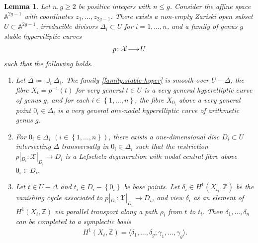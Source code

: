 \documentclass[a4paper,11pt,reqno]{amsart}
\makeatletter
\numberwithin{equation}{section}
\theoremstyle{plain}
\newtheorem{lemma}[theorem]{Lemma}
\theoremstyle{definition}
\newcommand{\Z}{\mathbb Z}
\newcommand{\A}{\mathbb A}
\newcommand{\ca}[1]{{\mathcal{#1}}}
\renewcommand{\longrightarrow}{\xymatrix@1@=15pt{\ar[r]&}}
\newcommand{\set}[1]{\left\{ #1 \right\}}
\makeatother
\begin{document}
\begin{lemma} \label{lemma:hyperelliptic-degeneration} 
Let $n, g \geq 2$ be positive integers with $n \leq g$. Consider the affine space $\A^{2g-1}$ with coordinates $z_1, \dotsc, z_{2g-1}$.  
There exists a non-empty Zariski open subset $U \subset \A^{2g-1}$, irreducible divisors $\Delta_i \subset U$ for $i = 1, \dotsc, n$, and a family of genus $g$ stable hyperelliptic curves
\begin{align} \label{family:stable-hyper}
p \colon \ca X\longrightarrow U
\end{align}
such that the following holds.
\begin{enumerate}
    \item \label{item:family:1} Let $\Delta \coloneqq \cup_i \Delta_i$. The family \eqref{family:stable-hyper} is smooth over $U - \Delta$, the fibre $X_t = p^{-1}(t)$ for very general $t \in U$ is a very general hyperelliptic curve of genus $g$, and for each $i \in \set{1,\dotsc, n}$, the fibre $X_{0_i}$ above a very general point $0_i \in \Delta_i$ is a very general one-nodal hyperelliptic curve of arithmetic genus $g$.  
      \item For $0_i \in \Delta_i$ $(i\in \set{1, \dotsc, n})$, there exists a one-dimensional disc $D_i \subset U$ intersecting $\Delta$ transversally in $0_i \in \Delta_i$ such that the restriction $p|_{D_i} \colon \ca X|_{D_i} \to D_i$ is a Lefschetz degeneration with nodal central fibre above $0_i \in D_i$. \label{item:family:2:Lefschetz}
      \item \label{item:family:3:symplectic}
      Let $t \in U- \Delta$ and $t_i \in D_i - \set{0_i}$ be base points. 
      Let $\delta_i\in H^1(X_{t_i},\Z)$ be the vanishing cycle associated to $p|_{D_i} \colon \ca X|_{D_i} \to D_i$, and view $\delta_i$ as an element of $H^1(X_t,\Z)$ via parallel transport along a path $\rho_i$ from $t$ to $t_i$. 
      Then $\delta_1,\dots, \delta_n$ can be completed to a symplectic basis 
\begin{align} \label{equation:symplecticbasis}
H^1(X_t,\Z) = \langle \delta_1, \dotsc, \delta_g; \gamma_1, \dotsc, \gamma_g \rangle .
\end{align}  
\end{enumerate}
\end{lemma}
\end{document}
